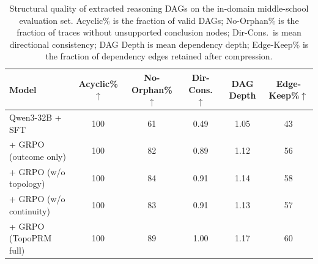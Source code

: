 \begin{table}[H]
\centering
\caption{Structural quality of extracted reasoning DAGs on the in-domain middle-school evaluation set.
  Acyclic\% is the fraction of valid DAGs;
  No-Orphan\% is the fraction of traces without unsupported conclusion nodes;
  Dir-Cons.\ is mean directional consistency;
  DAG Depth is mean dependency depth;
  Edge-Keep\% is the fraction of dependency edges retained after compression.}
\label{tab:structural_metrics}
\vspace{2pt}
\small
\setlength{\tabcolsep}{5.4pt}
\begin{tabular}{@{}l ccccc@{}}
\toprule
\textbf{Model}
  & \textbf{Acyclic\%}$\uparrow$
  & \textbf{No-Orphan\%}$\uparrow$
  & \textbf{Dir-Cons.}$\uparrow$
  & \textbf{DAG Depth}
  & \textbf{Edge-Keep\%}$\uparrow$ \\
\midrule
Qwen3-32B + SFT              & 100 & 61 & 0.49 & 1.05 & 43 \\
\quad + GRPO (outcome only)   & 100 & 82 & 0.89 & 1.12 & 56 \\
\quad + GRPO (w/o topology)   & 100 & 84 & 0.91 & 1.14 & 58 \\
\quad + GRPO (w/o continuity) & 100 & 83 & 0.91 & 1.13 & 57 \\
\rowcolor{blue!6}
\quad + GRPO (TopoPRM full)   & 100 & 89 & 1.00 & 1.17 & 60 \\
\bottomrule
\end{tabular}
\end{table}
